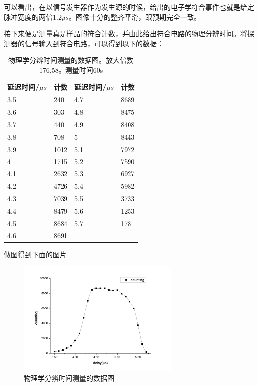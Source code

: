 \documentclass[aps,pre,12pt,preprint,onecolumn,showpacs,showkeys,UTF8]{revtex4-1}
\begin{document}
可以看出，在以信号发生器作为发生源的时候，给出的电子学符合事件也就是给定脉冲宽度的两倍$1.2\mu s$。图像十分的整齐平滑，跟预期完全一致。

接下来便是测量真是样品的符合计数，并由此给出符合电路的物理分辨时间。将探测器的信号输入到符合电路，可以得到以下的数据：
\begin{center}
	\begin{table}[h]
		\caption{物理学分辨时间测量的数据图。放大倍数176,58。测量时间60s}
		\begin{tabularx}{12cm}{XXXX}
			\hline
			\hline
			延迟时间/$\mu s$&计数&延迟时间/$\mu s$&计数\\
			\hline
3.5	&	240	&	4.7	&	8689	\\
3.6	&	303	&	4.8	&	8475	\\
3.7	&	440	&	4.9	&	8408	\\
3.8	&	708	&	5	&	8443	\\
3.9	&	1012	&	5.1	&	7972	\\
4	&	1715	&	5.2	&	7590	\\
4.1	&	2632	&	5.3	&	6927	\\
4.2	&	4726	&	5.4	&	5982	\\
4.3	&	7039	&	5.5	&	3733	\\
4.4	&	8479	&	5.6	&	1253	\\
4.5	&	8684	&	5.7	&	178	\\
4.6	&	8691	&	\\			
			\hline
			\hline
		\end{tabularx}
	\end{table}
\end{center}

做图得到下面的图片
\begin{figure}[h]
	\begin{center}
		\includegraphics[width=0.7\textwidth]{pic3.png}
		\caption{\label{fig:exp1}物理学分辨时间测量的数据图}
	\end{center}
\end{figure}
\end{document}
